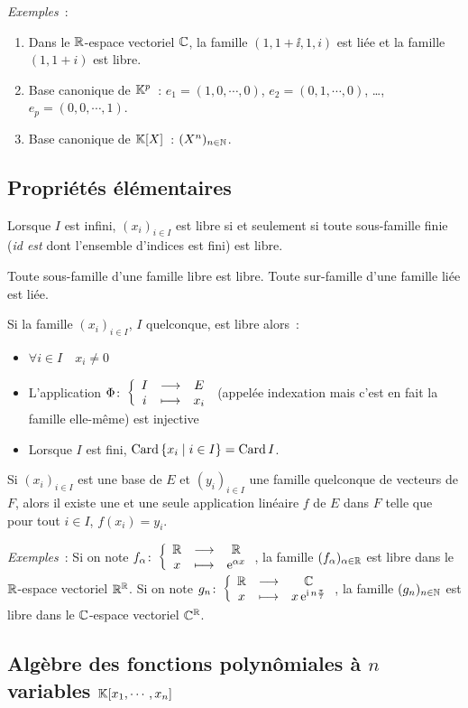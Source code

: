\emph{Exemples}~:
\begin{enumerate}
	\item Dans le $\mathbb{R}$-espace vectoriel $\mathbb{C}$, la famille $(1, 1+\ii, 1, i)$ est liée et la famille $(1, 1+i)$ est libre.
	\item Base canonique de $\mathbb{K}^p$~: $e_1 = (1,0,\cdots,0)$, $e_2 = (0,1,\cdots,0)$, \ldots, $e_p = (0,0,\cdots,1)$.
	\item Base canonique de $\mathbb{K}[X]$~: $(X^n)_{n \in \mathbb{N}}$.
\end{enumerate}

\subsection{Propriétés élémentaires}

Lorsque $I$ est infini, $(x_i)_{i \in I}$ est libre si et seulement si toute sous-famille finie (\emph{id est} dont l'ensemble d'indices est fini) est libre.

Toute sous-famille d'une famille libre est libre. Toute sur-famille d'une famille liée est liée.

Si la famille $(x_i)_{i \in I}$, $I$ quelconque, est libre alors~:
\begin{itemize}
	\item $\forall i \in I \quad x_i \neq 0$
	\item L'application $\Phi\colon \left\{\begin{array}{ccc} I & \longrightarrow &E\\ i & \longmapsto & x_i \end{array} \right.$ (appelée indexation mais c'est en fait la famille elle-même) est injective
	\item Lorsque $I$ est fini, $\operatorname{Card}\left\{x_i\mathrel{}\middle|\mathrel{}i \in I\right\} = \operatorname{Card} I$.
\end{itemize}

Si $(x_i)_{i \in I}$ est une base de $E$ et $(y_i)_{i \in I}$ une famille quelconque de vecteurs de $F$, alors il existe une et une seule application linéaire $f$ de $E$ dans $F$ telle que pour tout $i \in I$, $f(x_i) = y_i$.

\emph{Exemples}~:
Si on note $f_\alpha\colon \left\{\begin{array}{ccc} \mathbb{R} & \longrightarrow &\mathbb{R}\\ x & \longmapsto & \operatorname{e}^{\alpha x} \end{array} \right.$, la famille $(f_\alpha)_{\alpha \in \mathbb{R}}$ est libre dans le $\mathbb{R}$-espace vectoriel $\mathbb{R}^{\mathbb{R}}$.
Si on note $g_n\colon \left\{\begin{array}{ccc} \mathbb{R} & \longrightarrow &\mathbb{C}\\ x & \longmapsto & x\operatorname{e}^{\operatorname{i} n \frac{\pi}{7}} \end{array} \right.$, la famille $(g_n)_{n \in \mathbb{N}}$ est libre dans le $\mathbb{C}$-espace vectoriel $\mathbb{C}^{\mathbb{R}}$.

\subsection{Algèbre des fonctions polynômiales à $n$ variables $\mathbb{K}[x_1, \cdots, x_n]$}

